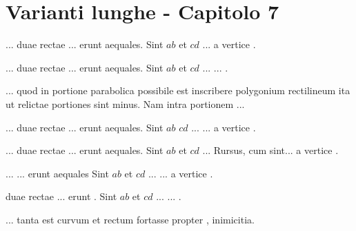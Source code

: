 \documentclass[12pt]{book}
\begin{document}
\section{Varianti lunghe - Capitolo 7}
\Unit ...  duae rectae ... erunt aequales.
Sint \(ab\) et \(cd\) ... a vertice .
\par
\Unit ...  duae rectae ... erunt aequales.
\Unit Sint \(ab\) et \(cd\) ... \Unit ... .
\par
\Unit ...
quod in portione parabolica possibile est inscribere polygonium rectilineum 
ita ut relictae portiones sint minus. \Unit  Nam intra portionem ...
\par
\Unit ...  duae rectae ... erunt aequales.
\Unit Sint \(ab\)  \(cd\) ... \Unit ... a vertice
.
\par
\Unit ...  duae rectae ... erunt aequales. \Unit 
Sint \(ab\) et \(cd\) ... \Unit Rursus, cum sint... a
vertice .
\par
\Unit ... 
... erunt aequales
\Unit Sint \(ab\) et \(cd\) ...
\Unit ... a vertice .
\par
\Unit {}
              duae rectae ... erunt .
\Unit Sint \(ab\) et \(cd\) ...
\Unit ... .
\par
\Unit ... tanta est 
                   curvum et rectum fortasse propter
, inimicitia.
\end{document}
